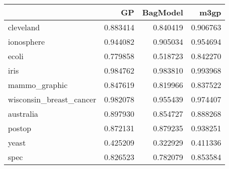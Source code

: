 \begin{tabular}{lrrr}
\toprule
{} &        GP &  BagModel &      m3gp \\
\midrule
cleveland               &  0.883414 &  0.840419 &  0.906763 \\
ionosphere              &  0.944082 &  0.905034 &  0.954694 \\
ecoli                   &  0.779858 &  0.518723 &  0.842270 \\
iris                    &  0.984762 &  0.983810 &  0.993968 \\
mammo\_graphic           &  0.847619 &  0.819966 &  0.837522 \\
wisconsin\_breast\_cancer &  0.982078 &  0.955439 &  0.974407 \\
australia               &  0.897930 &  0.854727 &  0.888268 \\
postop                  &  0.872131 &  0.879235 &  0.938251 \\
yeast                   &  0.425209 &  0.322929 &  0.411336 \\
spec                    &  0.826523 &  0.782079 &  0.853584 \\
\bottomrule
\end{tabular}
